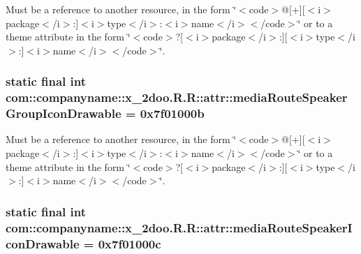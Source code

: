 Must be a reference to another resource, in the form \char`\"{}$<$code$>$@\mbox{[}+\mbox{]}\mbox{[}$<$i$>$package$<$/i$>$:\mbox{]}$<$i$>$type$<$/i$>$:$<$i$>$name$<$/i$>$$<$/code$>$\char`\"{} or to a theme attribute in the form \char`\"{}$<$code$>$?\mbox{[}$<$i$>$package$<$/i$>$:\mbox{]}\mbox{[}$<$i$>$type$<$/i$>$:\mbox{]}$<$i$>$name$<$/i$>$$<$/code$>$\char`\"{}. \hypertarget{classcom_1_1companyname_1_1x__2doo_1_1_r_1_1attr_3856794fd0495989f1c01e4727daa8cd}{
\subsubsection[{mediaRouteSpeakerGroupIconDrawable}]{\setlength{\rightskip}{0pt plus 5cm}static final int com::companyname::x\_\-2doo.R.R::attr::mediaRouteSpeakerGroupIconDrawable = 0x7f01000b}}
\label{classcom_1_1companyname_1_1x__2doo_1_1_r_1_1attr_3856794fd0495989f1c01e4727daa8cd}


Must be a reference to another resource, in the form \char`\"{}$<$code$>$@\mbox{[}+\mbox{]}\mbox{[}$<$i$>$package$<$/i$>$:\mbox{]}$<$i$>$type$<$/i$>$:$<$i$>$name$<$/i$>$$<$/code$>$\char`\"{} or to a theme attribute in the form \char`\"{}$<$code$>$?\mbox{[}$<$i$>$package$<$/i$>$:\mbox{]}\mbox{[}$<$i$>$type$<$/i$>$:\mbox{]}$<$i$>$name$<$/i$>$$<$/code$>$\char`\"{}. \hypertarget{classcom_1_1companyname_1_1x__2doo_1_1_r_1_1attr_dcd39f7685364f79f34f150e63164221}{
\subsubsection[{mediaRouteSpeakerIconDrawable}]{\setlength{\rightskip}{0pt plus 5cm}static final int com::companyname::x\_\-2doo.R.R::attr::mediaRouteSpeakerIconDrawable = 0x7f01000c}}
\label{classcom_1_1companyname_1_1x__2doo_1_1_r_1_1attr_dcd39f7685364f79f34f150e63164221}


